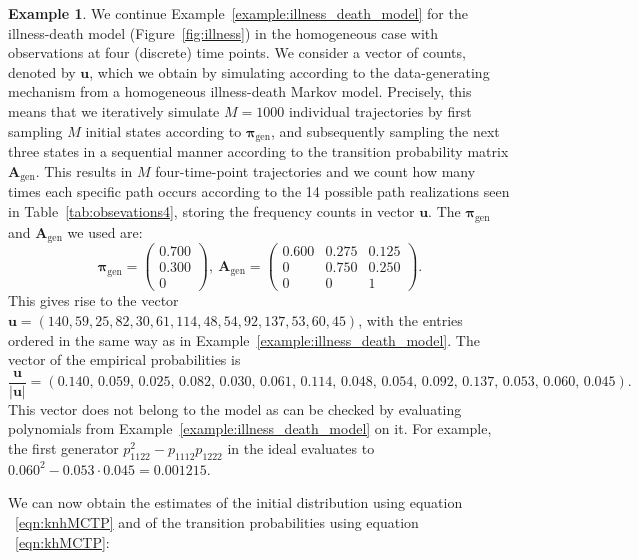 \documentclass[11pt, a4paper]{article}
\numberwithin{equation}{section}
\theoremstyle{plain}
\theoremstyle{definition}
\newtheorem{example}{Example}
\begin{document}
\begin{example} \label{example:homogeneous_MLE}
We continue Example~\ref{example:illness_death_model} for the illness-death model (Figure~\ref{fig:illness}) in the homogeneous case with observations at four (discrete) time points. We consider a vector of counts, denoted by $\textbf{u}$, which we  obtain by simulating according to the data-generating mechanism from a homogeneous illness-death Markov model. Precisely, this means that we iteratively simulate $M=1000$ individual  trajectories by first sampling $M$ initial states according to $\boldsymbol{\pi}_{\text{gen}}$, and subsequently sampling the next three states in a sequential manner according to the transition probability matrix $\textbf{A}_{\text{gen}}$. This results in $M$ four-time-point trajectories and we count how many times each specific path occurs according to the 14 possible path realizations seen in Table~\ref{tab:obsevations4}, storing the frequency counts in vector $\textbf{u}$. The $\boldsymbol{\pi}_{\text{gen}}$ and $\textbf{A}_{\text{gen}}$ we used are:
\[
\boldsymbol{\pi}_{\text{gen}} = \begin{pmatrix}
    0.700\\
    0.300\\
    0
\end{pmatrix} ,\ 
\textbf{A}_{\text{gen}} = \begin{pmatrix}
    0.600 &0.275& 0.125\\
     0  & 0.750 & 0.250\\
     0 & 0 & 1
\end{pmatrix}.
\]
This gives rise to the vector $\textbf{u}= (140,59,25,82,30,61,114,48,54,92,137,53,60,45)$, with the entries ordered in the same way as in Example~\ref{example:illness_death_model}.  The vector of the empirical probabilities  is 
\[
\frac{\textbf{u}}{|\textbf{u}|}=
(0.140,\,0.059,\,0.025,\,0.082,\,0.030,\,0.061,\,0.114,\,0.048,\,0.054,\,0.092,\,0.137,\,0.053,\,0.060,\,0.045).
\]
This vector does not belong to the model as can be checked by evaluating polynomials from Example~\ref{example:illness_death_model} on it. For example, the first generator $p_{1 1 2 2}^2-p_{1 1 1 2}p_{1 2 2 2}$ in the ideal evaluates to $0.060^2-0.053 \cdot 0.045 = 0.001215$.

We can now obtain the estimates of the initial distribution using equation ~\eqref{eqn:knhMCTP} and of the transition probabilities using equation ~\eqref{eqn:khMCTP}:


\end{example}
\end{document}
